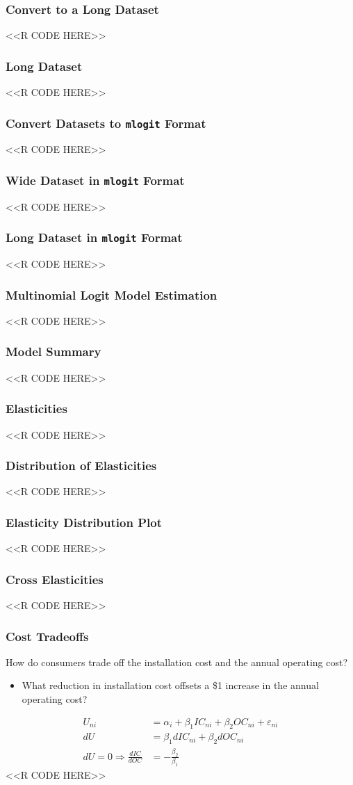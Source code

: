 \documentclass{beamer}
\begin{document}
\begin{frame}[fragile]\frametitle{Convert to a Long Dataset}
    <<R CODE HERE>>
\end{frame}

\begin{frame}[fragile]\frametitle{Long Dataset}
    <<R CODE HERE>>
\end{frame}

\begin{frame}[fragile]\frametitle{Convert Datasets to \texttt{mlogit} Format}
    <<R CODE HERE>>
\end{frame}

\begin{frame}[fragile]\frametitle{Wide Dataset in \texttt{mlogit} Format}
    <<R CODE HERE>>
\end{frame}

\begin{frame}[fragile]\frametitle{Long Dataset in \texttt{mlogit} Format}
    <<R CODE HERE>>
\end{frame}

\begin{frame}[fragile]\frametitle{Multinomial Logit Model Estimation}
    <<R CODE HERE>>
\end{frame}

\begin{frame}[fragile]\frametitle{Model Summary}
    <<R CODE HERE>>
\end{frame}

\begin{frame}[fragile]\frametitle{Elasticities}
    <<R CODE HERE>>
\end{frame}

\begin{frame}[fragile]\frametitle{Distribution of Elasticities}
    <<R CODE HERE>>
\end{frame}

\begin{frame}[fragile]\frametitle{Elasticity Distribution Plot}
    <<R CODE HERE>>
\end{frame}

\begin{frame}[fragile]\frametitle{Cross Elasticities}
    <<R CODE HERE>>
\end{frame}

\begin{frame}[fragile]\frametitle{Cost Tradeoffs}
    How do consumers trade off the installation cost and the annual operating cost?
    \begin{itemize}
        \item What reduction in installation cost offsets a \$1 increase in the annual operating cost?
    \end{itemize}
    \begin{align*}
        U_{ni} &= \alpha_i + \beta_1 IC_{ni} + \beta_2 OC_{ni} + \varepsilon_{ni} \\
        dU &= \beta_1 dIC_{ni} + \beta_2 dOC_{ni} \\
        dU = 0 \Rightarrow \frac{dIC}{dOC} &= -\frac{\beta_2}{\beta_1}
    \end{align*}
    <<R CODE HERE>>
\end{frame}
\end{document}
